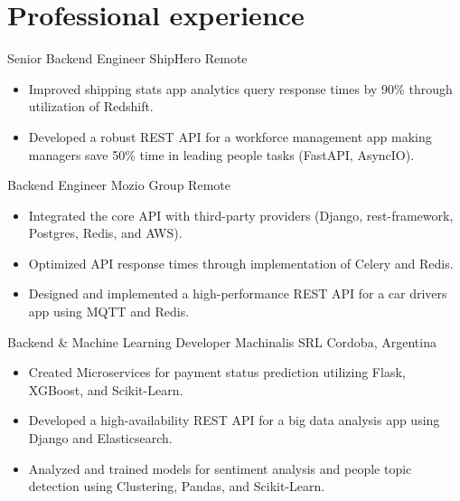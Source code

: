 
\section{Professional experience}
    {Senior Backend Engineer} %
    {ShipHero} %
    {Remote} %
    {}
    {
      \begin{itemize} %
        \item {Improved shipping stats app analytics query response times by 90\% through utilization of Redshift.}
        \item {Developed a robust REST API for a workforce management app making managers save 50\% time in leading people tasks (FastAPI, AsyncIO).}
      \end{itemize}
    }
    {Backend Engineer} %
    {Mozio Group} %
    {Remote} %
    {}
    {
      \begin{itemize} %
        \item {Integrated the core API with third-party providers (Django, rest-framework, Postgres, Redis, and AWS).}
        \item {Optimized API response times through implementation of Celery and Redis.}
        \item {Designed and implemented a high-performance REST API for a car drivers app using MQTT and Redis.}
      \end{itemize}
    }
    {Backend \& Machine Learning Developer} %
    {Machinalis SRL} %
    {Cordoba, Argentina} %
    {}
    {
      \begin{itemize} %
        \item {Created Microservices for payment status prediction utilizing Flask, XGBoost, and Scikit-Learn.}
        \item {Developed a high-availability REST API for a big data analysis app using Django and Elasticsearch.}
        \item {Analyzed and trained models for sentiment analysis and people topic detection using Clustering, Pandas, and Scikit-Learn.}
      \end{itemize}
    }

